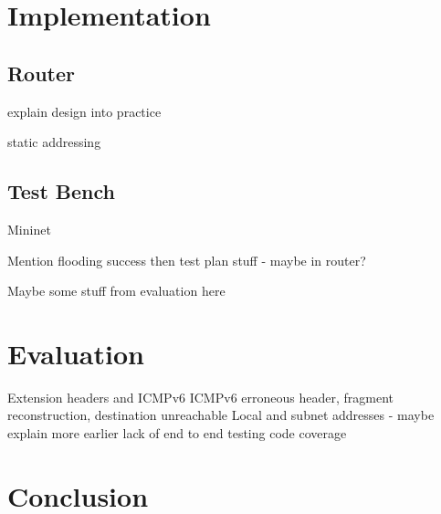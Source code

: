 \documentclass[12pt,a4paper,twoside,openright]{report}
\begin{document}
\chapter{Implementation}
\label{chap::implementation}

\section{Router}

explain design into practice

static addressing

\section{Test Bench}

Mininet

Mention flooding success then test plan stuff - maybe in router?


Maybe some stuff from evaluation here

\chapter{Evaluation}

Extension headers and ICMPv6
ICMPv6 erroneous header, fragment reconstruction, destination unreachable
Local and subnet addresses - maybe explain more earlier
lack of end to end testing
code coverage

\chapter{Conclusion}
\end{document}
